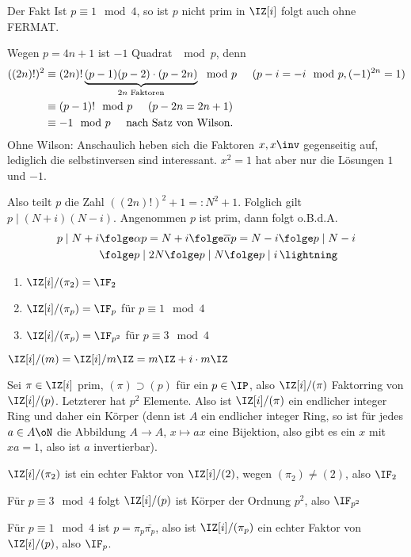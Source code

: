 \begin{Bemerkung}
 Der Fakt \glqq Ist $p\equiv 1\mod{4}$, so ist $p$ nicht prim in $\IZ[i]$\grqq{} folgt auch ohne FERMAT.
 \begin{Beweis}
  Wegen $p=4n+1$ ist $-1$ Quadrat $\mod{p}$, denn
  \begin{align*}
   ((2n)!)^2 &\equiv (2n)! \underbrace{(p-1)(p-2)\cdot (p-2n)}_{2n \text{ Faktoren}} \mod{p} \hspace{.5cm}(p-i=-i \mod{p}, (-1)^{2n}=1)\\
   & \equiv (p-1)! \mod{p}\hspace{.5cm} (p-2n=2n+1)\\
   & \equiv -1 \mod{p}\hspace{.5cm}\text{nach Satz von Wilson}.
  \end{align*}
Ohne Wilson: Anschaulich heben sich die Faktoren $x,x\inv$ gegenseitig auf, lediglich die selbstinversen sind interessant. $x^2=1$ hat aber nur die Lösungen $1$ und $-1$.

Also teilt $p$ die Zahl $((2n)!)^2+1=:N^2+1$. Folglich gilt $p\mid (N+i)(N-i)$. Angenommen $p$ ist prim, dann folgt o.B.d.A.
\begin{align*}
 p\mid N+i & \folge \alpha p = N+i \folge \overline{\alpha}p= N-i \folge p \mid N-i\\
 & \folge p \mid 2N \folge p \mid N \folge p \mid i \, \lightning
\end{align*}
 \end{Beweis}
\end{Bemerkung}

\begin{Fakt}
 \begin{enumerate}
  \item $\IZ[i]/(\pi_2) = \IF_2$
  \item $\IZ[i]/(\pi_p) = \IF_p$ für $p\equiv 1\mod{4}$
  \item $\IZ[i]/(\pi_p) = \IF_{p^2}$ für $p\equiv 3\mod{4}$
 \end{enumerate}
\end{Fakt}

\begin{Bemerkung}
 $\IZ[i]/(m)=\IZ[i]/m\IZ=m\IZ + i\cdot m\IZ$
\end{Bemerkung}

\begin{Beweis}
 Sei $\pi\in \IZ[i]$ prim, $(\pi)\supset (p)$ für ein $p\in\IP$, also $\IZ[i]/(\pi)$ Faktorring von $\IZ[i]/(p)$.
 Letzterer hat $p^2$ Elemente. Also ist $\IZ[i]/(\pi)$ ein endlicher integer Ring und daher ein Körper (denn ist $A$ ein endlicher integer Ring, so ist für jedes $a\in A\oN$ die Abbildung $A\rightarrow A$, $x\mapsto ax$ eine Bijektion, also gibt es ein $x$ mit $xa=1$, also ist $a$ invertierbar).
 
 $\IZ[i]/(\pi_2)$ ist ein echter Faktor von $\IZ[i]/(2)$, wegen $(\pi_2)\neq (2)$, also $\IF_2$
 
 Für $p\equiv 3 \mod{4}$ folgt $\IZ[i]/(p)$ ist Körper der Ordnung $p^2$, also $\IF_{p^2}$
 
 Für $p\equiv 1\mod{4}$ ist $p=\pi_p\overline{\pi_p}$, also ist $\IZ[i]/(\pi_p)$ ein echter Faktor von $\IZ[i]/(p)$, also $\IF_p$.
\end{Beweis}

